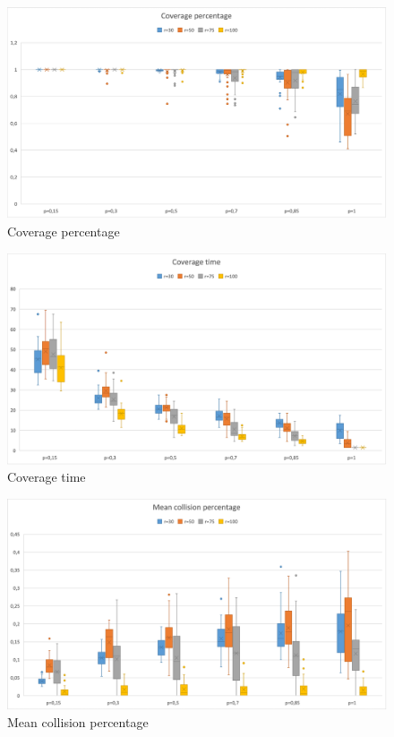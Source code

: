 \begin{figure}[h!]
\centering
    \includegraphics[width= .9\textwidth]{./images/Rate200Boxplot.png}
    \caption{Coverage percentage}
    \label{fig:coverage-percentage}
\end{figure}


\begin{figure}[h!]
\centering
    \includegraphics[width= .9\textwidth]{./images/Time200Boxplot.png}
    \caption{Coverage time}
    \label{fig:coverage-time200}
\end{figure}

\clearpage 

\begin{figure}[h!]
\centering
    \includegraphics[width= .9\textwidth]{./images/Collision200Boxplot.png}
    \caption{Mean collision percentage}
    \label{fig:mean-collision-rate200}
\end{figure}

